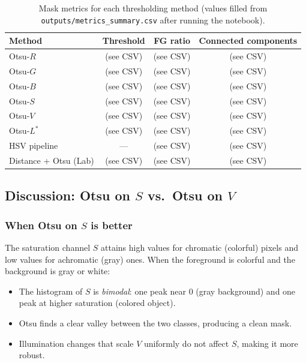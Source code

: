 \documentclass[12pt,a4paper]{article}
\begin{document}
\begin{table}[H]
\centering
\caption{Mask metrics for each thresholding method (values filled from \texttt{outputs/metrics\_summary.csv} after running the notebook).}
\label{tab:metrics}
\begin{tabular}{lccc}
\toprule
\textbf{Method} & \textbf{Threshold} & \textbf{FG ratio} & \textbf{Connected components} \\
\midrule
Otsu-$R$              & (see CSV) & (see CSV) & (see CSV) \\
Otsu-$G$              & (see CSV) & (see CSV) & (see CSV) \\
Otsu-$B$              & (see CSV) & (see CSV) & (see CSV) \\
Otsu-$S$              & (see CSV) & (see CSV) & (see CSV) \\
Otsu-$V$              & (see CSV) & (see CSV) & (see CSV) \\
Otsu-$L^*$            & (see CSV) & (see CSV) & (see CSV) \\
HSV pipeline          & ---       & (see CSV) & (see CSV) \\
Distance + Otsu (Lab) & (see CSV) & (see CSV) & (see CSV) \\
\bottomrule
\end{tabular}
\end{table}

\subsection{Discussion: Otsu on $S$ vs.\ Otsu on $V$}

\subsubsection{When Otsu on $S$ is better}
The saturation channel $S$ attains high values for chromatic (colorful) pixels and low values for achromatic (gray) ones.  When the foreground is colorful and the background is gray or white:
\begin{itemize}
    \item The histogram of $S$ is \emph{bimodal}: one peak near 0 (gray background) and one peak at higher saturation (colored object).
    \item Otsu finds a clear valley between the two classes, producing a clean mask.
    \item Illumination changes that scale $V$ uniformly do not affect $S$, making it more robust.
\end{itemize}
\end{document}
